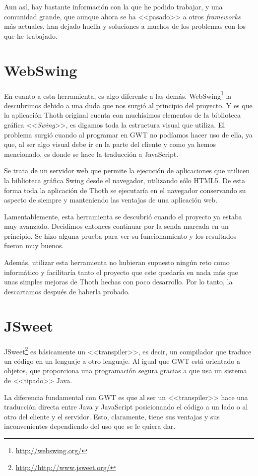 Aun así, hay bastante información con la que he podido trabajar, y una comunidad grande, que aunque ahora se ha <<pasado>> a otros \emph{frameworks} más actuales, han dejado huella y soluciones a muchos de los problemas con los que he trabajado.

\section{WebSwing}

En cuanto a esta herramienta, es algo diferente a las demás. WebSwing\footnote{\url{http://webswing.org/}} la descubrimos debido a una duda que nos surgió al principio del proyecto. Y es que la aplicación Thoth original cuenta con muchísimos elementos de la biblioteca gráfica <<\emph{Swing}>>, es digamos toda la estructura visual que utiliza. El problema surgió cuando al programar en GWT no podíamos hacer uso de ella, ya que, al ser algo visual debe ir en la parte del cliente y como ya hemos mencionado, es donde se hace la traducción a JavaScript. 

Se trata de un servidor web que permite la ejecución de aplicaciones que utilicen la biblioteca gráfica Swing desde el navegador, utilizando sólo HTML5. De esta forma toda la aplicación de Thoth se ejecutaría en el navegador conservando su aspecto de siempre y manteniendo las ventajas de una aplicación web.

Lamentablemente, esta herramienta se descubrió cuando el proyecto ya estaba muy avanzado. Decidimos entonces continuar por la senda marcada en un principio. Se hizo alguna prueba para ver su funcionamiento y los resultados fueron muy buenos.

Además, utilizar esta herramienta no hubieran supuesto ningún reto como informático y facilitaría tanto el proyecto que este quedaría en nada más que
unas simples mejoras de Thoth hechas con poco desarrollo. Por lo tanto, la descartamos después de haberla probado.

\section{JSweet} 

JSweet\footnote{\url{http://http://www.jsweet.org/}} es básicamente un <<transpiler>>, es decir, un compilador que traduce un código en un lenguaje a otro lenguaje. Al igual que GWT está orientado a objetos, que proporciona una programación segura gracias a que usa un sistema de <<tipado>> Java.

La diferencia fundamental con GWT es que al ser un <<transpiler>> hace una traducción directa entre Java y JavaScript posicionando el código a un lado o al otro del cliente y el servidor. Esto, claramente, tiene sus ventajas y sus inconvenientes dependiendo del uso que se le quiera dar. 


